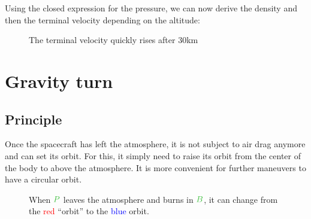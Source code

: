 Using the closed expression for the pressure, we can now derive the
density and then the terminal velocity depending on the altitude:

\begin{figure}[H]
	\centering
	\caption{The terminal velocity quickly rises after 30km}
\end{figure}

\section{Gravity turn}

\subsection{Principle}

Once the spacecraft has left the atmosphere, it is not subject to air
drag anymore and can set its orbit. For this, it simply need to raise
its orbit from the center of the body to above the atmosphere. It is
more convenient for further maneuvers to have a circular orbit.

\begin{figure}[H]
	\centering
	\caption{
		When $\posit{P}$ leaves the atmosphere and burns in
		$\posit{B}$, it can change from the \textcolor{red}{red}
		“orbit” to the \textcolor{blue}{blue} orbit.
	}
\end{figure}

